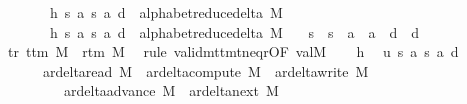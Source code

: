 \begin{isabellebody}
\ \ \ \ \ \ \ h{}{\isacharcolon}{\kern0pt}\ {\isachardoublequoteopen}{\isacharparenleft}{\kern0pt}s{\isacharcomma}{\kern0pt}\ a{\isacharcomma}{\kern0pt}\ s{}{\isacharcomma}{\kern0pt}\ a{}{\isacharcomma}{\kern0pt}\ d{}{\isacharparenright}{\kern0pt}\ {\isasymin}\ alphabet{\isacharunderscore}{\kern0pt}reduce{\isacharunderscore}{\kern0pt}delta\ M{\isachardoublequoteclose}\isanewline
\ \ \ \ \ \ \ h{}{\isacharcolon}{\kern0pt}\ {\isachardoublequoteopen}{\isacharparenleft}{\kern0pt}s{\isacharcomma}{\kern0pt}\ a{\isacharcomma}{\kern0pt}\ s{}{\isacharcomma}{\kern0pt}\ a{}{\isacharcomma}{\kern0pt}\ d{}{\isacharparenright}{\kern0pt}\ {\isasymin}\ alphabet{\isacharunderscore}{\kern0pt}reduce{\isacharunderscore}{\kern0pt}delta\ M{\isachardoublequoteclose}\isanewline
\ \ \ {\isachardoublequoteopen}s{}\ {\isacharequal}{\kern0pt}\ s{}\ {\isasymand}\ a{}\ {\isacharequal}{\kern0pt}\ a{}\ {\isasymand}\ d{}\ {\isacharequal}{\kern0pt}\ d{}{\isachardoublequoteclose}\isanewline
%
\isadelimproof
%
\endisadelimproof
%
\isatagproof
{}\isamarkupfalse%
\ {\isacharminus}{\kern0pt}\isanewline
\ \ \isamarkupfalse%
\ tr{\isacharcolon}{\kern0pt}\ {\isachardoublequoteopen}t{\isacharunderscore}{\kern0pt}tm\ M\ {\isasymnoteq}\ r{\isacharunderscore}{\kern0pt}tm\ M{\isachardoublequoteclose}\ \isamarkupfalse%
\ {\isacharparenleft}{\kern0pt}rule\ valid{\isacharunderscore}{\kern0pt}mttm{\isacharunderscore}{\kern0pt}t{\isacharunderscore}{\kern0pt}neq{\isacharunderscore}{\kern0pt}r{\isacharbrackleft}{\kern0pt}OF\ valM{\isacharbrackright}{\kern0pt}{\isacharparenright}{\kern0pt}\isanewline
\ \ \isamarkupfalse%
\ h{}\ \isamarkupfalse%
\ u{}{\isacharcolon}{\kern0pt}\ {\isachardoublequoteopen}{\isacharparenleft}{\kern0pt}s{\isacharcomma}{\kern0pt}\ a{\isacharcomma}{\kern0pt}\ s{}{\isacharcomma}{\kern0pt}\ a{}{\isacharcomma}{\kern0pt}\ d{}{\isacharparenright}{\kern0pt}\ {\isasymin}\isanewline
\ \ \ \ \ \ ar{\isacharunderscore}{\kern0pt}delta{\isacharunderscore}{\kern0pt}read\ M\ {\isasymunion}\ ar{\isacharunderscore}{\kern0pt}delta{\isacharunderscore}{\kern0pt}compute\ M\ {\isasymunion}\ ar{\isacharunderscore}{\kern0pt}delta{\isacharunderscore}{\kern0pt}write\ M\isanewline
\ \ \ \ \ \ \ \ {\isasymunion}\ ar{\isacharunderscore}{\kern0pt}delta{\isacharunderscore}{\kern0pt}advance\ M\ {\isasymunion}\ ar{\isacharunderscore}{\kern0pt}delta{\isacharunderscore}{\kern0pt}next\ M{\isachardoublequoteclose}\isanewline

\end{isabellebody}
